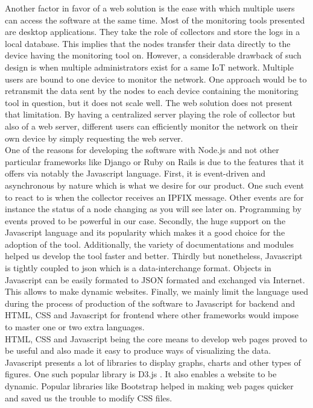 Another factor in favor of a web solution is the ease with which multiple users can access the software at the same time. Most of the monitoring tools presented are desktop applications. They take the role of collectors and store the logs in a local database. This implies that the nodes transfer their data directly to the device having the monitoring tool on. However, a considerable drawback of such design is when multiple administrators exist for a same IoT network. Multiple users are bound to one device to monitor the network. One approach would be to retransmit the data sent by the nodes to each device containing the monitoring tool in question, but it does not scale well. The web solution does not present that limitation. By having a centralized server playing the role of collector but also of a web server, different users can efficiently monitor the network on their own device by simply requesting the web server. \\

One of the reasons for developing the software with Node.js and not other particular frameworks like Django or Ruby on Rails is due to the features that it offers via notably the Javascript language. First, it is event-driven and asynchronous by nature which is what we desire for our product. One such event to react to is when the collector receives an IPFIX message. Other events are for instance the status of a node changing as you will see later on. Programming by events proved to be powerful in our case. Secondly, the huge support on the Javascript language and its popularity which makes it a good choice for the adoption of the tool. Additionally, the variety of documentations and modules helped us develop the tool faster and better. Thirdly but nonetheless, Javascript is tightly coupled to \acrfull{json} \cite{website:json} which is a data-interchange format. Objects in Javascript can be easily formated to JSON formated and exchanged via Internet. This allows to make dynamic websites. Finally, we mainly limit the language used during the process of production of the software to Javascript for backend and HTML, CSS and Javascript for frontend where other frameworks would impose to master one or two extra languages.\\

HTML, CSS and Javascript being the core means to develop web pages proved to be useful and also made it easy to produce ways of visualizing the data. Javascript presents a lot of libraries to display graphs, charts and other types of figures. One such popular library is D3.js \cite{website:d3}. It also enables a website to be dynamic. Popular libraries like Bootstrap\cite{website:bootstrap} helped in making web pages quicker and saved us the trouble to modify CSS files.\\

